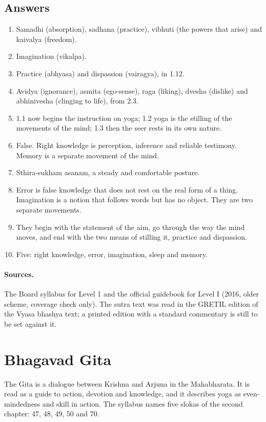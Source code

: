 \subsection*{Answers}
\begin{enumerate}
\item Samadhi (absorption), sadhana (practice), vibhuti (the powers that arise) and kaivalya (freedom).
\item Imagination (vikalpa).
\item Practice (abhyasa) and dispassion (vairagya), in 1.12.
\item Avidya (ignorance), asmita (ego-sense), raga (liking), dvesha (dislike) and abhinivesha (clinging to life), from 2.3.
\item 1.1 now begins the instruction on yoga; 1.2 yoga is the stilling of the movements of the mind; 1.3 then the seer rests in its own nature.
\item False. Right knowledge is perception, inference and reliable testimony. Memory is a separate movement of the mind.
\item Sthira-sukham asanam, a steady and comfortable posture.
\item Error is false knowledge that does not rest on the real form of a thing. Imagination is a notion that follows words but has no object. They are two separate movements.
\item They begin with the statement of the aim, go through the way the mind moves, and end with the two means of stilling it, practice and dispassion.
\item Five: right knowledge, error, imagination, sleep and memory.
\end{enumerate}

\paragraph{Sources.} The Board syllabus for Level 1 and the official guidebook for Level I (2016, older scheme, coverage check only). The sutra text was read in the GRETIL edition of the Vyasa bhashya text; a printed edition with a standard commentary is still to be set against it.

\section{Bhagavad Gita}
\label{sec:bhagavad-gita}

The Gita is a dialogue between Krishna and Arjuna in the Mahabharata. It is read as a guide to action, devotion and knowledge, and it describes yoga as even-mindedness and skill in action.
The syllabus names five slokas of the second chapter: 47, 48, 49, 50 and 70.


